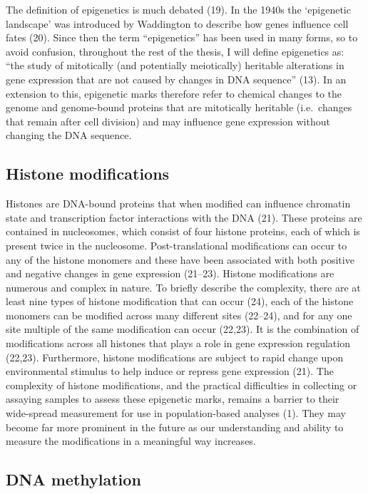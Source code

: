 \documentclass[11pt,oneside]{bristolthesis}
\begin{document}
The definition of epigenetics is much debated (19). In the 1940s the `epigenetic landscape' was introduced by Waddington to describe how genes influence cell fates (20). Since then the term ``epigenetics'' has been used in many forms, so to avoid confusion, throughout the rest of the thesis, I will define epigenetics as: ``the study of mitotically (and potentially meiotically) heritable alterations in gene expression that are not caused by changes in DNA sequence'' (13). In an extension to this, epigenetic marks therefore refer to chemical changes to the genome and genome-bound proteins that are mitotically heritable (i.e.~changes that remain after cell division) and may influence gene expression without changing the DNA sequence.

\hypertarget{histone-modifications}{%
\subsection{Histone modifications}\label{histone-modifications}}

Histones are DNA-bound proteins that when modified can influence chromatin state and transcription factor interactions with the DNA (21). These proteins are contained in nucleosomes, which consist of four histone proteins, each of which is present twice in the nucleosome. Post-translational modifications can occur to any of the histone monomers and these have been associated with both positive and negative changes in gene expression (21--23). Histone modifications are numerous and complex in nature. To briefly describe the complexity, there are at least nine types of histone modification that can occur (24), each of the histone monomers can be modified across many different sites (22--24), and for any one site multiple of the same modification can occur (22,23). It is the combination of modifications across all histones that plays a role in gene expression regulation (22,23). Furthermore, histone modifications are subject to rapid change upon environmental stimulus to help induce or repress gene expression (21). The complexity of histone modifications, and the practical difficulties in collecting or assaying samples to assess these epigenetic marks, remains a barrier to their wide-spread measurement for use in population-based analyses (1). They may become far more prominent in the future as our understanding and ability to measure the modifications in a meaningful way increases.

\hypertarget{dna-methylation}{%
\subsection{DNA methylation}\label{dna-methylation}}
\end{document}
